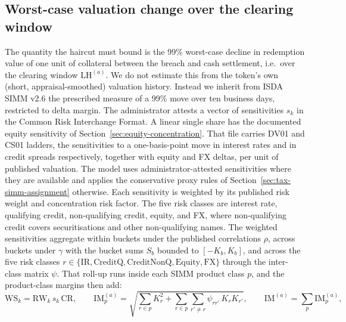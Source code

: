\subsection{Worst-case valuation change over the clearing window}\label{sec:theory:stress}

The quantity the haircut must bound is the 99\% worst-case decline in redemption value of one unit of collateral between the breach and cash settlement, i.e.\ over the clearing window $\mathrm{LH}^{(a)}$. We do not estimate this from the token's own (short, appraisal-smoothed) valuation history. Instead we inherit from ISDA SIMM v2.6 \cite{isda_simm_v2_6} the prescribed measure of a 99\% move over ten business days, restricted to delta margin. The administrator attests a vector of sensitivities $s_k$ in the Common Risk Interchange Format. A linear single share has the documented equity sensitivity of Section~\ref{sec:equity-concentration}. That file carries DV01 and CS01 ladders, the sensitivities to a one-basis-point move in interest rates and in credit spreads respectively, together with equity and FX deltas, per unit of published valuation. The model uses administrator-attested sensitivities where they are available and applies the conservative proxy rules of Section~\ref{sec:tax-simm-assignment} otherwise. Each sensitivity is weighted by its published risk weight and concentration risk factor. The five risk classes are interest rate, qualifying credit, non-qualifying credit, equity, and FX, where non-qualifying credit covers securitisations and other non-qualifying names. The weighted sensitivities aggregate within buckets under the published correlations $\rho$, across buckets under $\gamma$ with the bucket sums $S_b$ bounded to $[-K_b,K_b]$, and across the five risk classes $r\in\{\mathrm{IR},\mathrm{CreditQ},\mathrm{CreditNonQ},\mathrm{Equity},\mathrm{FX}\}$ through the inter-class matrix $\psi$. That roll-up runs inside each SIMM product class $p$, and the product-class margins then add:
\begin{equation}\label{eq:simm-core}
\mathrm{WS}_k = \mathrm{RW}_k\, s_k\, \mathrm{CR},\qquad
\mathrm{IM}_p^{(a)} = \sqrt{\textstyle\sum_{r\in p} K_r^2 + \sum_{r\in p}\sum_{r'\ne r}\psi_{rr'}\,K_r K_{r'}},\qquad
\mathrm{IM}^{(a)} = \sum_p \mathrm{IM}_p^{(a)},
\end{equation}
